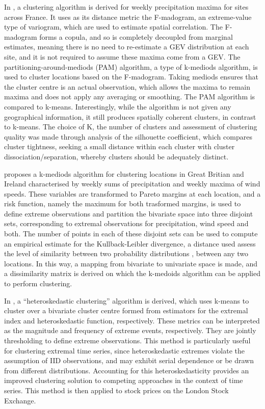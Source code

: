 \documentclass{article}
\numberwithin{equation}{section}
\begin{document}
In \citet{Bernard2013}, a clustering algorithm is derived for weekly precipitation maxima for sites across France.
It uses as its distance metric the F-madogram, an extreme-value type of variogram, which are used to estimate spatial correlation. 
The F-madogram forms a copula, and so is completely decoupled from marginal estimates, meaning there is no need to re-estimate a GEV distribution at each site, and it is not required to assume these maxima come from a GEV.
The partitioning-around-mediods (PAM) algorithm, a type of k-mediods algorithm, is used to cluster locations based on the F-madogram. 
Taking mediods ensures that the cluster centre is an actual observation, which allows the maxima to remain maxima and does not apply any averaging or smoothing. 
The PAM algorithm is compared to k-means.
Interestingly, while the algorithm is not given any geographical information, it still produces spatially coherent clusters, in contrast to k-means.
The choice of K, the number of clusters and assessment of clustering quality was made through analysis of the silhouette coefficient, which compares cluster tightness, seeking a small distance within each cluster with cluster dissociation/separation, whereby clusters should be adequately distinct.

\citet{Vignotto2021} proposes a k-mediods algorithm for clustering locations in Great Britian and Ireland characterised by weekly sums of precipitation and weekly maxima of wind speeds.
These variables are transformed to Pareto margins at each location, and a risk function, namely the maximum for both trasformed margins, is used to define extreme observations and partition the bivariate space into three disjoint sets, corresponding to extremal observations for precipitation, wind speed and both. 
The number of points in each of these disjoint sets can be used to compute an empirical estimate for the Kullback-Leibler divergence, a distance used assess the level of similarity between two probability distributions \citep{Kullback1951}, between any two locations.
In this way, a mapping from bivariate to univariate space is made, and a dissimilarity matrix is derived on which the k-medoids algorithm can be applied to perform clustering. 

In \citet{deCarvalho2023}, a ``heteroskedastic clustering'' algorithm is derived, which uses k-means to cluster over a bivariate cluster centre formed from estimators for the extremal index and heteroskedastic function, respectively. 
These metrics can be interpreted as the magnitude and frequency of extreme events, respectively.
They are jointly thresholding to define extreme observations.
This method is particularly useful for clustering extremal time series, since heteroskedastic extremes violate the assumption of IID observations, and may exhibit serial dependence or be drawn from different distributions. 
Accounting for this heteroskedasticity provides an improved clustering solution to competing approaches in the context of time series. 
This method is then applied to stock prices on the London Stock Exchange. 
\end{document}
